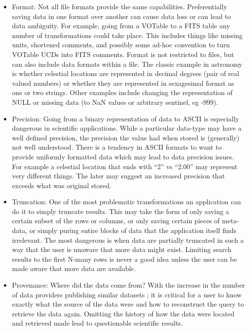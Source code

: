 \documentclass[11pt,twoside]{article}
\begin{document}
\begin{itemize}

\item Format:  Not all file formats provide the same capabilities.  
  Preferentially saving data in one format over another can cause 
  data loss or can lead to data ambiguity.  For example, going from
  a VOTable to a FITS table any number of transformations could take place.
  This includes things like missing units, shortened comments, 
  and possibly some ad-hoc convention to turn VOTable UCDs into
  FITS comments.
  Format is not restricted to files, but can also include data formats within a file.  The classic example in astronomy is whether celestial
  locations are represented in decimal degrees (pair of real valued numbers)
  or  whether they are represented in sexagesimal format as one or two strings.
  Other examples include changing the representation of NULL or missing
  data (to NaN values or arbitrary sentinel, eg -999).


\item Precision:  Going from a binary representation of data to ASCII is 
  especially dangerous in scientific applications.   While a particular
data-type may have a well defined precision, the precision the 
value had when stored is (generally) not well understood. There is a
tendency in ASCII formats to want to provide uniformly formatted data which may
lead to data precision issues.  For example a celestial location that ends with ``2'' vs ``2.00'' may represent very different things.  The later may suggest
an increased precision that exceeds what was original stored.


\item Truncation:  One of the most problematic transformations an application
can do it to simply truncate results.  This may take the form of only saving 
a certain subset of the rows or columns, or only saving certain pieces
of meta-data, or simply puring entire blocks of data that the
application itself finds irrelevant.  The most dangerous is when 
data are partially truncated in such a way that the user is unaware that
more data might exist.  Limiting search results to the first N-many
rows is never a good idea unless the user can be made aware that 
more data are available.


\item Provenance: Where did the data come from? With the increase in the number
of data providers publishing similar datasets ; it is critical for a user
to know exactly what the source of the data were and how to reconstruct
the query to retrieve the data again.  Omitting the history of how the 
data were located and retrieved made lead to questionable scientific
results.

\end{itemize}
\end{document}

